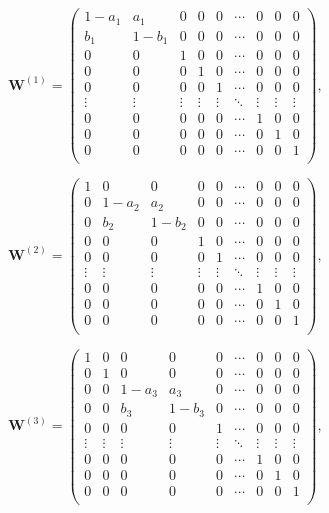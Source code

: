 \documentclass[twoside,openright,titlepage,numbers=noenddot,headinclude,  lineheaders footinclude=true,cleardoublepage=empty,
                                BCOR=5mm,paper=a4,fontsize=12pt ]{scrbook}
\theoremstyle{definition}
\begin{document}
\[
\mathbf{W}^{(1)} = 
\begin{pmatrix}
1-a_1 & a_1   & 0 & 0 & 0 & \cdots & 0 & 0 & 0\\
b_1   & 1-b_1 & 0 & 0 & 0 & \cdots & 0 & 0 & 0\\
0   & 0   & 1 & 0 & 0 & \cdots & 0 & 0 & 0\\
0   & 0   & 0 & 1 & 0 & \cdots & 0 & 0 & 0\\
0   & 0   & 0 & 0 & 1 & \cdots & 0 & 0 & 0\\
\vdots & \vdots & \vdots & \vdots & \vdots & \ddots & \vdots
& \vdots & \vdots\\
0   & 0   & 0 & 0 & 0 & \cdots & 1 & 0 & 0\\
0   & 0   & 0 & 0 & 0 & \cdots & 0 & 1 & 0\\
0   & 0   & 0 & 0 & 0 & \cdots & 0 & 0 & 1\\
\end{pmatrix}
,
\]

\[
\mathbf{W}^{(2)}=
\begin{pmatrix}
1 & 0   & 0 & 0 & 0 & \cdots & 0 & 0 & 0\\
0   & 1-a_2 & a_2 & 0 & 0 & \cdots & 0 & 0 & 0\\
0   & b_2   & 1-b_2 & 0 & 0 & \cdots & 0 & 0 & 0\\
0   & 0   & 0 & 1 & 0 & \cdots & 0 & 0 & 0\\
0   & 0   & 0 & 0 & 1 & \cdots & 0 & 0 & 0\\
\vdots & \vdots & \vdots & \vdots & \vdots & \ddots & \vdots
& \vdots & \vdots\\
0   & 0   & 0 & 0 & 0 & \cdots & 1 & 0 & 0\\
0   & 0   & 0 & 0 & 0 & \cdots & 0 & 1 & 0\\
0   & 0   & 0 & 0 & 0 & \cdots & 0 & 0 & 1\\
\end{pmatrix}
,
\]

\[
\mathbf{W}^{(3)}=
\begin{pmatrix}
1 & 0   & 0 & 0 & 0 & \cdots & 0 & 0 & 0\\
0   & 1 & 0 & 0 & 0 & \cdots & 0 & 0 & 0\\
0   & 0   & 1-a_3 & a_3 & 0 & \cdots & 0 & 0 & 0\\
0   & 0   & b_3 & 1-b_3 & 0 & \cdots & 0 & 0 & 0\\
0   & 0   & 0 & 0 & 1 & \cdots & 0 & 0 & 0\\
\vdots & \vdots & \vdots & \vdots & \vdots & \ddots & \vdots
& \vdots & \vdots\\
0   & 0   & 0 & 0 & 0 & \cdots & 1 & 0 & 0\\
0   & 0   & 0 & 0 & 0 & \cdots & 0 & 1 & 0\\
0   & 0   & 0 & 0 & 0 & \cdots & 0 & 0 & 1\\
\end{pmatrix}
,
\]
\end{document}
